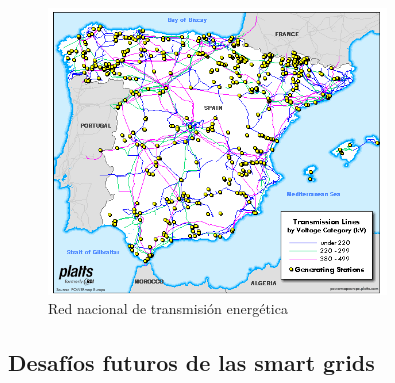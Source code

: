 


\cite{spain}


\begin{figure}[h!]
  \centering
  \includegraphics[width=0.8\textwidth]{img/teoria/spain.png}
  \caption{Red nacional de transmisión energética \cite{spain}}
  \label{fig:spain}
\end{figure}







\vspace{1mm}

\subsection{Desafíos futuros de las smart grids}

